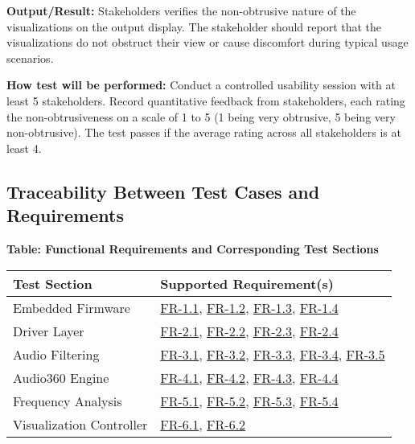 \documentclass[12pt, titlepage]{article}
\begin{document}
\begin{enumerate}
\textbf{Output/Result:} 
Stakeholders verifies the non-obtrusive nature of the visualizations on the
output display. The stakeholder should report that the visualizations do not
obstruct their view or cause discomfort during typical usage scenarios.

\textbf{How test will be performed:} 
Conduct a controlled usability session with at least 5 stakeholders. Record
quantitative feedback from stakeholders, each rating the non-obtrusiveness on a
scale of 1 to 5 (1 being very obtrusive, 5 being very non-obtrusive). The test
passes if the average rating across all stakeholders is at least 4.

\end{enumerate}

\subsection{Traceability Between Test Cases and Requirements}

\noindent
\textbf{Table: Functional Requirements and Corresponding Test Sections}

\noindent
\begin{tabular}{|l|l|}
\hline
\textbf{Test Section} & \textbf{Supported Requirement(s)} \\ \hline
Embedded Firmware & \hyperref[SRS-FR1_1]{FR-1.1}, \hyperref[SRS-FR1_2]{FR-1.2},
\hyperref[SRS-FR1_3]{FR-1.3}, \hyperref[SRS-FR1_4]{FR-1.4} \\ \hline
Driver Layer & \hyperref[SRS-FR2_1]{FR-2.1}, \hyperref[SRS-FR2_2]{FR-2.2},
\hyperref[SRS-FR2_3]{FR-2.3}, \hyperref[SRS-FR2_4]{FR-2.4} \\ \hline
Audio Filtering & \hyperref[SRS-FR3_1]{FR-3.1}, \hyperref[SRS-FR3_2]{FR-3.2},
\hyperref[SRS-FR3_3]{FR-3.3}, \hyperref[SRS-FR3_4]{FR-3.4},
\hyperref[SRS-FR3_5]{FR-3.5} \\ \hline
Audio360 Engine & \hyperref[SRS-FR4_1]{FR-4.1}, \hyperref[SRS-FR4_2]{FR-4.2},
\hyperref[SRS-FR4_3]{FR-4.3}, \hyperref[SRS-FR4_4]{FR-4.4} \\ \hline
Frequency Analysis & \hyperref[SRS-FR5_1]{FR-5.1},
\hyperref[SRS-FR5_2]{FR-5.2}, \hyperref[SRS-FR5_3]{FR-5.3},
\hyperref[SRS-FR5_4]{FR-5.4} \\ \hline
Visualization Controller & \hyperref[SRS-FR6_1]{FR-6.1},
\hyperref[SRS-FR6_2]{FR-6.2} \\ \hline
\end{tabular}

\vspace{0.5cm}
\end{document}
